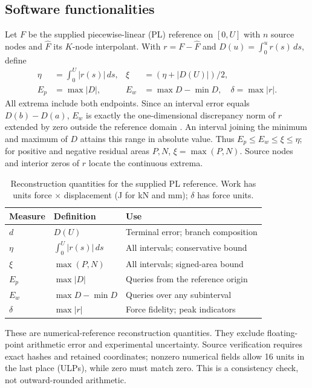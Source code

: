 \documentclass[preprint,12pt,a4paper]{elsarticle}
\begin{document}
\subsection{Software functionalities}
Let $F$ be the supplied piecewise-linear (PL) reference on $[0,U]$ with $n$ source nodes and $\widehat F$ its $K$-node interpolant. With $r=F-\widehat F$ and $D(u)=\int_0^u r(s)\,ds$, define
\begin{align}
\eta&=\int_0^U|r(s)|\,ds,&\xi&=(\eta+|D(U)|)/2,\label{eq:area}\\
E_p&=\max|D|,&E_w&=\max D-\min D,\quad\delta=\max|r|.\label{eq:errors}
\end{align}
All extrema include both endpoints. Since an interval error equals $D(b)-D(a)$, $E_w$ is exactly the one-dimensional discrepancy norm of $r$ extended by zero outside the reference domain \cite{Bouchot2014}. An interval joining the minimum and maximum of $D$ attains this range in absolute value. Thus $E_p\leq E_w\leq\xi\leq\eta$; for positive and negative residual areas $P,N$, $\xi=\max(P,N)$. Source nodes and interior zeros of $r$ locate the continuous extrema.

\begin{table}[!htbp]\small\centering
\caption{Reconstruction quantities for the supplied PL reference. Work has units force $\times$ displacement (J for kN and mm); $\delta$ has force units.}\label{tab:measures}
\begin{tabular}{P{.12\linewidth}P{.30\linewidth}P{.48\linewidth}}\toprule
Measure&Definition&Use\\\midrule
$d$&$D(U)$&Terminal error; branch composition\\
$\eta$&$\int_0^U |r(s)|\,ds$&All intervals; conservative bound\\
$\xi$&$\max(P,N)$&All intervals; signed-area bound\\
$E_p$&$\max|D|$&Queries from the reference origin\\
$E_w$&$\max D-\min D$&Queries over any subinterval\\
$\delta$&$\max|r|$&Force fidelity; peak indicators\\\bottomrule
\end{tabular}\end{table}

These are numerical-reference reconstruction quantities. They exclude floating-point arithmetic error and experimental uncertainty. Source verification requires exact hashes and retained coordinates; nonzero numerical fields allow 16 units in the last place (ULPs), while zero must match zero. This is a consistency check, not outward-rounded arithmetic.
\end{document}
